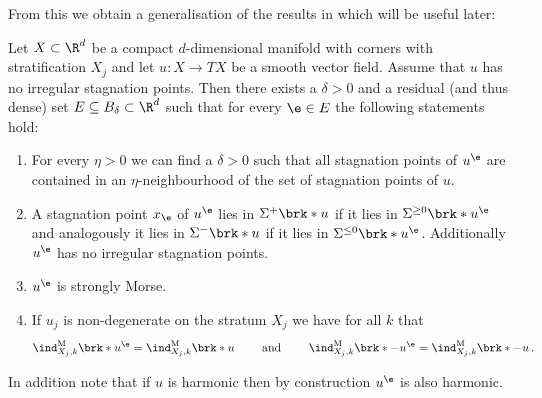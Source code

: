 From this we obtain
a generalisation of the results in \cite[§2]{Morse1970} which will be useful later:
\begin{corollary}\label{co:density_boundaryGeneric}
  Let $X\subset\R^d$ be a compact $d$-dimensional manifold with corners with stratification $X_j$ and let $u\colon X\to TX$ be a smooth vector field.
  Assume that $u$ has no irregular stagnation points.
  Then there exists a $\delta>0$ and a residual (and thus dense) set $E\subseteq B_\delta\subset\R^d$ such that for every $\e\in E$
  the following statements hold:
  \begin{enumerate}
    \item For every $\eta>0$ we can find a $\delta>0$ such that all stagnation points of $u^\e$ are contained in an 
    $\eta$-neighbourhood of the set of stagnation points of $u$.\label{co:nonDegeneracy_density_etaNbh}
    \item A stagnation point $x_\e$ of $u^\e$ lies in $\Sigma^+\brk*{u}$ if it lies in $\Sigma^{\geq0}\brk*{u^\e}$ 
      and analogously it lies in $\Sigma^-\brk*{u}$ if it lies in $\Sigma^{\leq0}\brk*{u^\e}$. Additionally $u^\e$ has no
      irregular stagnation points.
      \label{co:nonDegeneracy_density_entrEmerg}
    \item $u^\e$ is strongly Morse. \label{co:nonDegeneracy_density_nonDeg}
    \item If $u_j$ is non-degenerate on the stratum $X_j$ we have\label{co:nonDegeneracy_density_index}
    for all $k$ that
    \begin{align*}
      \ind^\text{M}_{X_j,k}\brk*{u^\e}=\ind^\text{M}_{X_j,k}\brk*{u}\qquad\text{ and }\qquad\ind^\text{M}_{X_j,k}\brk*{-u^\e}=\ind^\text{M}_{X_j,k}\brk*{-u}\,.
    \end{align*}
  \end{enumerate}
  In addition note that if $u$ is harmonic then by construction $u^\e$ is also harmonic.
\end{corollary}

